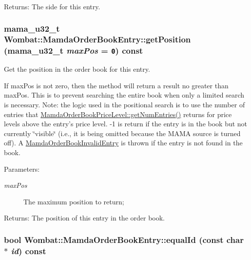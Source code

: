 \begin{Desc}
\item[Returns:]The side for this entry. \end{Desc}
\hypertarget{classWombat_1_1MamdaOrderBookEntry_8fa9b93116640f02e93e3fa4eea3dee2}{
\subsubsection[getPosition]{\setlength{\rightskip}{0pt plus 5cm}mama\_\-u32\_\-t Wombat::Mamda\-Order\-Book\-Entry::get\-Position (mama\_\-u32\_\-t {\em max\-Pos} = {\tt 0}) const}}
\label{classWombat_1_1MamdaOrderBookEntry_8fa9b93116640f02e93e3fa4eea3dee2}


Get the position in the order book for this entry. 

If max\-Pos is not zero, then the method will return a result no greater than max\-Pos. This is to prevent searching the entire book when only a limited search is necessary. Note: the logic used in the positional search is to use the number of entries that \hyperlink{classWombat_1_1MamdaOrderBookPriceLevel_a2e83c8a0e607cb5e73982573eb267f4}{Mamda\-Order\-Book\-Price\-Level::get\-Num\-Entries()} returns for price levels above the entry's price level. -1 is return if the entry is in the book but not currently \char`\"{}visible\char`\"{} (i.e., it is being omitted because the MAMA source is turned off). A \hyperlink{classWombat_1_1MamdaOrderBookInvalidEntry}{Mamda\-Order\-Book\-Invalid\-Entry} is thrown if the entry is not found in the book.

\begin{Desc}
\item[Parameters:]
\begin{description}
\item[{\em max\-Pos}]The maximum position to return;\end{description}
\end{Desc}
\begin{Desc}
\item[Returns:]The position of this entry in the order book. \end{Desc}
\hypertarget{classWombat_1_1MamdaOrderBookEntry_ed761cda818725c86f8230388c5711b0}{
\subsubsection[equalId]{\setlength{\rightskip}{0pt plus 5cm}bool Wombat::Mamda\-Order\-Book\-Entry::equal\-Id (const char $\ast$ {\em id}) const}}
\label{classWombat_1_1MamdaOrderBookEntry_ed761cda818725c86f8230388c5711b0}


